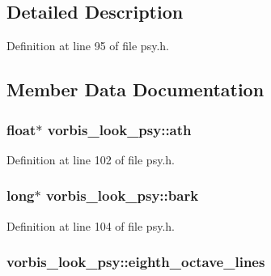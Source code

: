 \subsection{Detailed Description}


Definition at line 95 of file psy.\+h.



\subsection{Member Data Documentation}
\subsubsection[{\texorpdfstring{ath}{ath}}]{\setlength{\rightskip}{0pt plus 5cm}float$\ast$ vorbis\+\_\+look\+\_\+psy\+::ath}\hypertarget{structvorbis__look__psy_a3446b16512508584e3d81cfbb07ab390}{}\label{structvorbis__look__psy_a3446b16512508584e3d81cfbb07ab390}


Definition at line 102 of file psy.\+h.

\subsubsection[{\texorpdfstring{bark}{bark}}]{\setlength{\rightskip}{0pt plus 5cm}long$\ast$ vorbis\+\_\+look\+\_\+psy\+::bark}\hypertarget{structvorbis__look__psy_ab26f48178c7d4493eb8a814553441844}{}\label{structvorbis__look__psy_ab26f48178c7d4493eb8a814553441844}


Definition at line 104 of file psy.\+h.

\subsubsection[{\texorpdfstring{eighth\+\_\+octave\+\_\+lines}{eighth_octave_lines}}]{ vorbis\+\_\+look\+\_\+psy\+::eighth\+\_\+octave\+\_\+lines}\hypertarget{structvorbis__look__psy_afc52eca23e371be299e975dbedb16340}{}\label{structvorbis__look__psy_afc52eca23e371be299e975dbedb16340}


